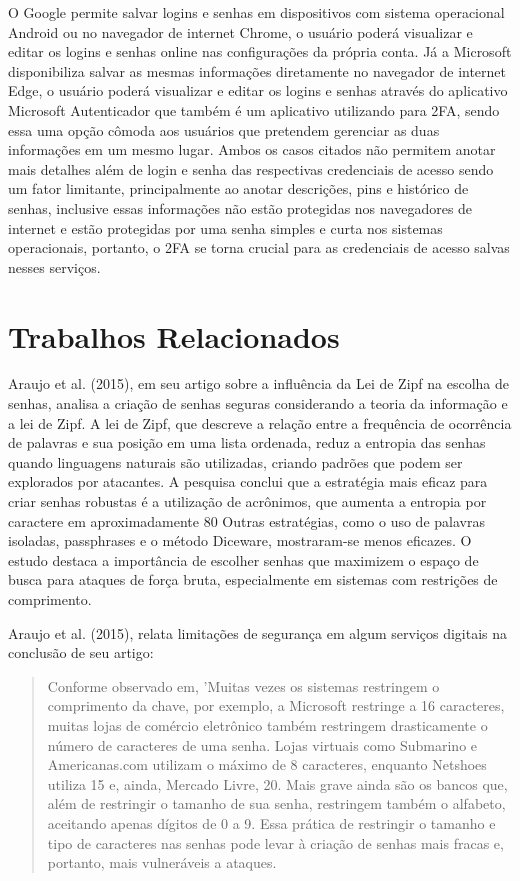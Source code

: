 \documentclass[12pt]{article}
\begin{document}
O Google permite salvar logins e senhas em dispositivos com sistema
operacional Android ou no navegador de internet Chrome, o usuário poderá
visualizar e editar os logins e senhas online nas configurações da
própria conta.
Já a Microsoft disponibiliza salvar as mesmas informações diretamente no
navegador de internet Edge, o usuário poderá visualizar e editar os
logins e senhas através do aplicativo Microsoft Autenticador que também
é um aplicativo utilizando para 2FA, sendo essa uma opção cômoda aos
usuários que pretendem gerenciar as duas informações em um mesmo lugar.
Ambos os casos citados não permitem anotar mais detalhes além de login e
senha das respectivas credenciais de acesso sendo um fator limitante,
principalmente ao anotar descrições, pins e histórico de senhas,
inclusive essas informações não estão protegidas nos navegadores de
internet e estão protegidas por uma senha simples e curta nos sistemas
operacionais, portanto, o 2FA se torna crucial para as credenciais de
acesso salvas nesses serviços.

\section{Trabalhos Relacionados}

Araujo et al. (2015), em seu artigo sobre a influência da Lei de Zipf na
escolha de senhas, analisa a criação de senhas seguras considerando a
teoria da informação e a lei de Zipf.
A lei de Zipf, que descreve a relação entre a frequência de ocorrência de
palavras e sua posição em uma lista ordenada, reduz a entropia das senhas
quando linguagens naturais são utilizadas, criando padrões que podem ser
explorados por atacantes.
A pesquisa conclui que a estratégia mais eficaz para criar senhas robustas
é a utilização de acrônimos, que aumenta a entropia por caractere em
aproximadamente 80%
Outras estratégias, como o uso de palavras isoladas, passphrases e o
método Diceware, mostraram-se menos eficazes.
O estudo destaca a importância de escolher senhas que maximizem o espaço
de busca para ataques de força bruta, especialmente em sistemas com
restrições de comprimento.

Araujo et al. (2015), relata limitações de segurança em algum serviços
digitais na conclusão de seu artigo:
\begin{quote}
  Conforme observado em, 'Muitas vezes os sistemas restringem o comprimento da chave, por exemplo, a
  Microsoft restringe a 16 caracteres, muitas lojas de comércio eletrônico também restringem drasticamente o
  número de caracteres de uma senha. Lojas virtuais como Submarino e Americanas.com utilizam o máximo de 8
  caracteres, enquanto Netshoes utiliza 15 e, ainda, Mercado Livre, 20. Mais grave ainda são os bancos que,
  além de restringir o tamanho de sua senha, restringem também o alfabeto, aceitando apenas dígitos de 0 a 9.
  Essa prática de restringir o tamanho e tipo de caracteres nas senhas pode levar à criação de senhas mais
  fracas e, portanto, mais vulneráveis a ataques. \cite{araujo:2015}
\end{quote}
\end{document}
